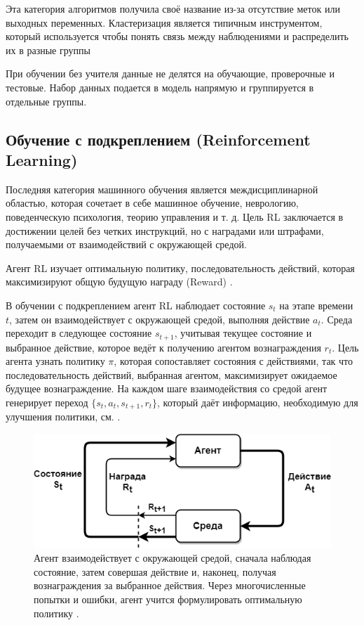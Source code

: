 Эта категория алгоритмов получила своё название из-за отсутствие меток или выходных переменных. Кластеризация является типичным инструментом, который используется чтобы понять связь между наблюдениями и распределить их в разные группы \cite{hastie2001elements}

При обучении без учителя данные не делятся на обучающие, проверочные и тестовые. Набор данных подается в модель напрямую и группируется в отдельные группы.


\subsection{Обучение с подкреплением (Reinforcement Learning)}

Последняя категория машинного обучения является междисциплинарной областью, которая сочетает в себе машинное обучение, неврологию, поведенческую психология, теорию управления и т. д. Цель RL заключается в достижении целей без четких инструкций, но с наградами или штрафами, получаемыми от взаимодействий с окружающей средой. 

Агент RL изучает оптимальную политику, последовательность действий, которая максимизируют общую будущую награду (Reward) \cite{SuttonAndBarto-RL-Introduction-p2}.

В обучении с подкреплением агент RL наблюдает состояние ${s_t}$ на этапе времени ${t}$, затем он взаимодействует с окружающей средой, выполняя действие ${a_t}$. Среда переходит в следующее состояние ${s_{t+1}}$, учитывая текущее состояние и выбранное действие, которое ведёт к получению агентом вознаграждения ${r_t}$. Цель агента узнать политику $\pi$, которая сопоставляет состояния с действиями, так что последовательность действий, выбранная агентом, максимизирует ожидаемое будущее вознаграждение. На каждом шаге взаимодействия со средой агент генерирует переход ${\{s_t, a_t, s_{t+1}, r_t\}}$, который даёт информацию, необходимую для улучшения политики, см. .

\begin{figure}[ht!] 
	\center
	\includegraphics [scale=0.60] {my_folder/images/ch1/rl-flow.png}
	\caption{Агент взаимодействует с окружающей средой, сначала наблюдая состояние, затем совершая действие и, наконец, получая вознаграждения за выбранное действия. Через многочисленные попытки и ошибки, агент учится формулировать оптимальную политику \cite{SuttonAndBarto-RL-Introduction-p50}.} 
	\label{fig:ch1-RL-flow}
\end{figure}
